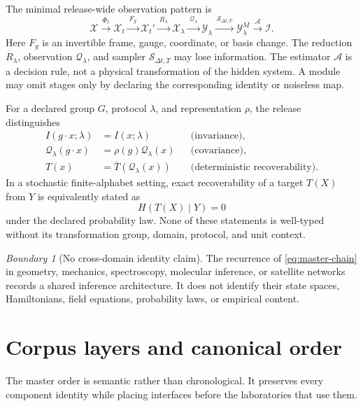 \documentclass[11pt,a4paper]{article}
\theoremstyle{definition}
\theoremstyle{plain}
\theoremstyle{remark}
\newtheorem{boundary}[definition]{Boundary}
\newcommand{\Xcal}{\mathcal X}
\newcommand{\Ycal}{\mathcal Y}
\newcommand{\Ical}{\mathcal I}
\newcommand{\Qcal}{\mathcal Q}
\newcommand{\Scal}{\mathcal S}
\newcommand{\Acal}{\mathcal A}
\begin{document}
The minimal release-wide observation pattern is
\begin{equation}\label{eq:master-chain}
\Xcal
\xrightarrow{\ \Phi_t\ }
\Xcal_t
\xrightarrow{\ F_g\ }
\Xcal_t'
\xrightarrow{\ R_\lambda\ }
\Xcal_\lambda
\xrightarrow{\ \Qcal_\lambda\ }
\Ycal_\lambda
\xrightarrow{\ \Scal_{\Delta t,T}\ }
\Ycal_\lambda^M
\xrightarrow{\ \Acal\ }
\Ical .
\end{equation}
Here \(F_g\) is an invertible frame, gauge, coordinate, or basis
change.  The reduction \(R_\lambda\), observation \(\Qcal_\lambda\),
and sampler \(\Scal_{\Delta t,T}\) may lose information.  The estimator
\(\Acal\) is a decision rule, not a physical transformation of the
hidden system.  A module may omit stages only by declaring the
corresponding identity or noiseless map.

For a declared group \(G\), protocol \(\lambda\), and representation
\(\rho\), the release distinguishes
\begin{align}
I(g\!\cdot\!x;\lambda)&=I(x;\lambda)
&&\text{(invariance)},\\
\Qcal_\lambda(g\!\cdot\!x)&=\rho(g)\Qcal_\lambda(x)
&&\text{(covariance)},\\
T(x)&=\overline T\!\left(\Qcal_\lambda(x)\right)
&&\text{(deterministic recoverability)}.
\end{align}
In a stochastic finite-alphabet setting, exact recoverability of a
target \(T(X)\) from \(Y\) is equivalently stated as
\begin{equation}
H\!\left(T(X)\mid Y\right)=0
\end{equation}
under the declared probability law.  None of these statements is
well-typed without its transformation group, domain, protocol, and
unit context.

\begin{boundary}[No cross-domain identity claim]
The recurrence of \cref{eq:master-chain} in geometry, mechanics,
spectroscopy, molecular inference, or satellite networks records a
shared inference architecture.  It does not identify their state
spaces, Hamiltonians, field equations, probability laws, or empirical
content.
\end{boundary}

\section{Corpus layers and canonical order}

The master order is semantic rather than chronological.  It preserves
every component identity while placing interfaces before the
laboratories that use them.
\end{document}
